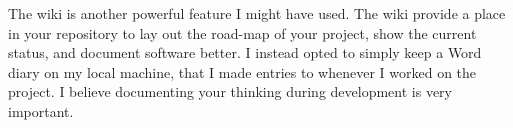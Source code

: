 The wiki is another powerful feature I might have used. The wiki provide a place in your repository to lay out the road-map of your project, show the current status, and document software better. I instead opted to simply keep a Word diary on my local machine, that I made entries to whenever I worked on the project. I believe documenting your thinking during development is very important.
